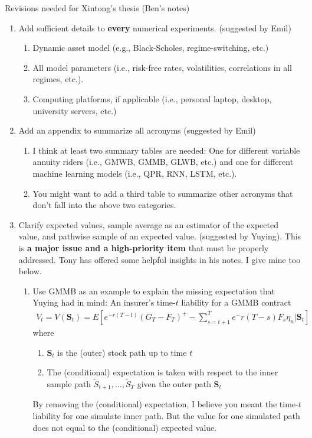 \documentclass[letterpaper]{article}
\begin{document}
\begin{center}
\large
    Revisions needed for Xintong's thesis (Ben's notes)
\end{center}

\begin{enumerate}
    \item Add sufficient details to \textbf{every} numerical experiments. (suggested by Emil)
    \begin{enumerate}
        \item Dynamic asset model (e.g., Black-Scholes, regime-switching, etc.)
        \item All model parameters (i.e., risk-free rates, volatilities, correlations in all regimes, etc.).
        \item Computing platforms, if applicable (i.e., personal laptop, desktop, university servers, etc.)
    \end{enumerate}

    \item Add an appendix to summarize all acronyms (suggested by Emil)
    \begin{enumerate}
        \item I think at least two summary tables are needed: One for different variable annuity riders (i.e., GMWB, GMMB, GLWB, etc.) and one for different machine learning models (i.e., QPR, RNN, LSTM, etc.).

        \item You might want to add a third table to summarize other acronyms that don't fall into the above two categories.
    \end{enumerate}

    \item Clarify expected values, sample average as an estimator of the expected value, and pathwise sample of an expected value. (suggested by Yuying). This is \textbf{a major issue and a high-priority item} that must be properly addressed. Tony has offered some helpful insights in his notes. I give mine too below. 

    \begin{enumerate}
        \item Use GMMB as an example to explain the missing expectation that Yuying had in mind: An insurer's time-$t$ liability for a GMMB contract
        \begin{align*}
            V_t = V(\bm{S}_t) = E[e^{-r(T-t)}(G_T-F_T)^+ - \sum_{s=t+1}^T e^-r(T-s) F_s \eta_n | \bm{S}_t]
        \end{align*}
    where
    \begin{enumerate}
        \item $\bm{S}_t$ is the (outer) stock path up to time $t$
        \item The (conditional) expectation is taken with respect to the inner sample path $\widetilde{S}_{t+1},\ldots,\widetilde{S}_T$ given the outer path $\bm{S}_t$
    \end{enumerate}
    By removing the (conditional) expectation, I believe you meant the time-$t$ liability for one simulate inner path. But the value for one simulated path does not equal to the (conditional) expected value.


\end{enumerate}
\end{enumerate}
\end{document}
